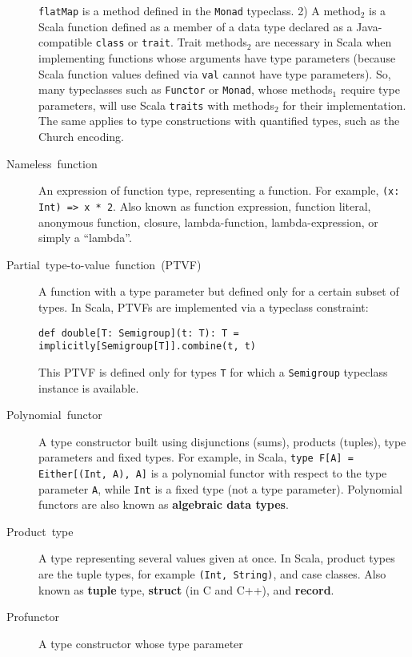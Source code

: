 \begin{description}
\lstinline!flatMap! is a method defined in the \lstinline!Monad!
typeclass. 2) A method$_{2}$ is a Scala function defined as a member
of a data type declared as a Java-compatible \lstinline!class! or
\lstinline!trait!. Trait methods$_{2}$ are necessary in Scala when
implementing functions whose arguments have type parameters (because
Scala function values defined via \lstinline!val! cannot have type
parameters). So, many typeclasses such as \lstinline!Functor! or
\lstinline!Monad!, whose methods$_{1}$ require type parameters,
will use Scala \lstinline!traits! with methods$_{2}$ for their implementation.
The same applies to type constructions with quantified types, such
as the Church encoding. 
\item [{Nameless~function}] An expression of
function type, representing a function. For example, \lstinline!(x: Int) => x * 2!.
Also known as function expression, function literal, anonymous function,
closure, lambda-function,
lambda-expression, or simply a \textsf{``}lambda\textsf{''}.
\item [{Partial~type-to-value~function~(PTVF)}] A function with a type
parameter but defined only for a certain subset of types.
In Scala, PTVFs are implemented via a typeclass constraint:
\begin{lstlisting}
def double[T: Semigroup](t: T): T = implicitly[Semigroup[T]].combine(t, t)
\end{lstlisting}
This PTVF is defined only for types \lstinline!T! for which a \lstinline!Semigroup!
typeclass instance is available.
\item [{Polynomial~functor}] A type constructor
built using disjunctions (sums), products (tuples), type parameters
and fixed types. For example, in Scala, \lstinline!type F[A] = Either[(Int, A), A]!
is a polynomial functor with respect to the type parameter \lstinline!A!,
while \lstinline!Int! is a fixed type (not a type parameter). Polynomial
functors are also known as \textbf{algebraic data types}.
\item [{Product~type}] A type representing several
values given at once. In Scala, product types are the tuple types,
for example \lstinline!(Int, String)!, and case classes. Also known
as \textbf{tuple} type, \textbf{struct} (in C and C++),
and \textbf{record}.
\item [{\index{profunctor}Profunctor}] A type constructor whose type parameter

\end{description}
